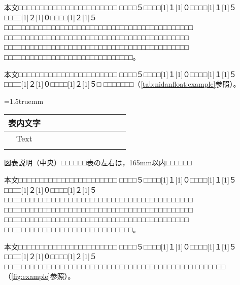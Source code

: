 \documentclass[platex,fleqn]{ieej-tec2}%
\def\tabref#1{\tablename\ref{#1}}
\def\figref#1{\figurename\ref{#1}}
\begin{document}
本文□□□□□□□□□□□□□□□□□□□□□□□
□□□□５□□□□\scalebox{0.5}[1]{１}\scalebox{0.5}[1]{０}□□□□\scalebox{0.5}[1]{１}\scalebox{0.5}[1]{５}□□□□\scalebox{0.5}[1]{２}\scalebox{0.5}[1]{０}□□□□\scalebox{0.5}[1]{２}\scalebox{0.5}[1]{５}□□□□□□□□□□□□□□□□□□□□□□□□□□□□□□□□□□□□□□□□□□□□
□□□□□□□□□□□□□□□□□□□□□□□□□□□□□□□□□□□□□□□□□□□
□□□□□□□□□□□□□□□□□□□□□□□□□□□□□□□□□□□□□□□□□□□
□□□□□□□□□□□□□□□□□□□□□□□□□□□□□□。

本文□□□□□□□□□□□□□□□□□□□□□□□
□□□□５□□□□\scalebox{0.5}[1]{１}\scalebox{0.5}[1]{０}□□□□\scalebox{0.5}[1]{１}\scalebox{0.5}[1]{５}□□□□\scalebox{0.5}[1]{２}\scalebox{0.5}[1]{０}□□□□\scalebox{0.5}[1]{２}\scalebox{0.5}[1]{５}□
□□□□□□□（\tabref{tab:nidanfloat:example}参照）。

\begin{table*}[t]
\centering
\caption{Title.}
\label{tab:nidanfloat:example}
\tabcolsep=1.5truemm
\begin{tabular}{|c|c|c|c|c|c|c|c|c|c|c|}\hline
表内文字 & \hspace{4zw} &  \hspace{4zw} &  \hspace{4zw} &  \hspace{4zw} &  \hspace{4zw} &  \hspace{4zw} &  \hspace{4zw} &  \hspace{4zw} &  \hspace{4zw} &  \hspace{4zw} \\\hline
Text & & & & & & & & & & \\\hline
& & & & & & & & & & \\\hline
\end{tabular}
\par
\begin{minipage}{\hsize}
\scriptsize\centering%
図表説明（中央）□□□□□□表の左右は，165mm以内□□□□□□
\end{minipage}
\end{table*}

本文□□□□□□□□□□□□□□□□□□□□□□□
□□□□５□□□□\scalebox{0.5}[1]{１}\scalebox{0.5}[1]{０}□□□□\scalebox{0.5}[1]{１}\scalebox{0.5}[1]{５}□□□□\scalebox{0.5}[1]{２}\scalebox{0.5}[1]{０}□□□□\scalebox{0.5}[1]{２}\scalebox{0.5}[1]{５}□□□□□□□□□□□□□□□□□□□□□□□□□□□□□□□□□□□□□□□□□□□□
□□□□□□□□□□□□□□□□□□□□□□□□□□□□□□□□□□□□□□□□□□□□
□□□□□□□□□□□□□□□□□□□□□□□□□□□□□□□□□□□□□□□□□□□
□□□□□□□□□□□□□□□□□□□□□□□□□□□□□□。

本文□□□□□□□□□□□□□□□□□□□□□□□
□□□□５□□□□\scalebox{0.5}[1]{１}\scalebox{0.5}[1]{０}□□□□\scalebox{0.5}[1]{１}\scalebox{0.5}[1]{５}□□□□\scalebox{0.5}[1]{２}\scalebox{0.5}[1]{０}□□□□\scalebox{0.5}[1]{２}\scalebox{0.5}[1]{５}□□□□□□□□□□□□□□□□□□□□□□□□□□□□□□□□□□□□□□□□□□□□
□□□□□□□（\figref{fig:example}参照）。
\end{document}
